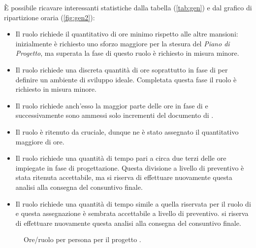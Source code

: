 È possibile ricavare interessanti statistiche dalla tabella (\ref{tab:gen}) e dal grafico di ripartizione oraria (\ref{fig:gen2}): %
\begin{itemize}
\item Il ruolo {\Rx} richiede il quantitativo di ore minimo rispetto alle altre mansioni: inizialmente è richiesto uno sforzo maggiore per la stesura del \emph{Piano di Progetto}, ma superata la fase di {\AR} questo ruolo è richiesto in misura minore.
\item Il ruolo {\AMx} richiede una discreta quantità di ore soprattutto in fase di {\AR} per definire un ambiente di sviluppo ideale. Completata questa fase il ruolo è richiesto in misura minore.
\item Il ruolo {\ANx} richiede anch'esso la maggior parte delle ore in fase di {\AR} e successivamente sono ammessi solo incrementi del documento di {\AR}.
\item Il ruolo {\PJx} è ritenuto da {\hx} cruciale, dunque ne è stato assegnato il quantitativo maggiore di ore.
\item Il ruolo {\PGx} richiede una quantità di tempo pari a circa due terzi delle ore impiegate in fase di progettazione. Questa divisione a livello di preventivo è stata ritenuta accettabile, ma {\hx} si riserva di effettuare nuovamente questa analisi alla consegna del consuntivo finale.
\item Il ruolo {\Vx} richiede una quantità di tempo simile a quella riservata per il ruolo di {\PGx} e questa assegnazione è sembrata accettabile a livello di preventivo. {\hx} si riserva di effettuare nuovamente questa analisi alla consegna del consuntivo finale.
\end{itemize}



\pagebreak

\begin{figure}[H]
\caption{Ore/ruolo per persona per il progetto {\proj}.}
\label{fig:gen1}

\end{figure}


